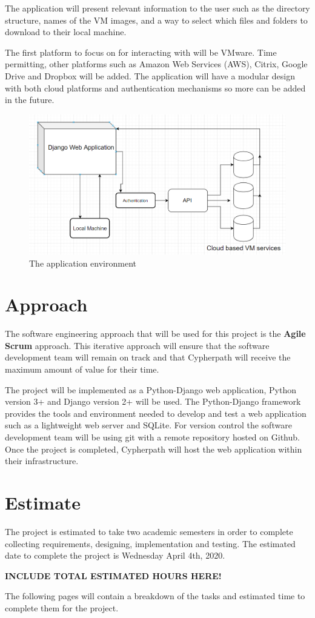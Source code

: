 \documentclass{article}
\begin{document}
    The application will present relevant information to the user such as the directory structure, names of the VM images, and a way to select which files and folders
    to download to their local machine.

    The first platform to focus on for interacting with will be VMware. Time permitting, other platforms such as Amazon Web Services (AWS), Citrix, Google Drive and Dropbox
    will be added. The application will have a modular design with both cloud platforms and authentication mechanisms so more can be added in the future.

    \begin{figure}[h]
    \includegraphics[scale=.7]{diagram}
        \caption{The application environment}
    \end{figure}

    \pagebreak
    \section{Approach}
    The software engineering approach that will be used for this project is the \textbf{Agile Scrum} approach.
    This iterative approach will ensure that the software development team will remain on track and that Cypherpath will receive the maximum amount of value
    for their time.

    The project will be implemented as a Python-Django web application, Python version 3+ and Django version 2+ will be used. The Python-Django framework provides the tools 
    and environment needed to develop and test a web application such as a lightweight web server and SQLite. For version control the software development team will be using git
    with a remote repository hosted on Github. Once the project is completed, Cypherpath will host the web application within their infrastructure.

    \section{Estimate}
    The project is estimated to take two academic semesters in order to complete collecting requirements, designing, implementation and testing. The estimated date
    to complete the project is Wednesday April 4th, 2020.

    \Huge \textbf{INCLUDE TOTAL ESTIMATED HOURS HERE!}

    The following pages will contain a breakdown of the tasks and estimated time to complete them for the project.
\end{document}

